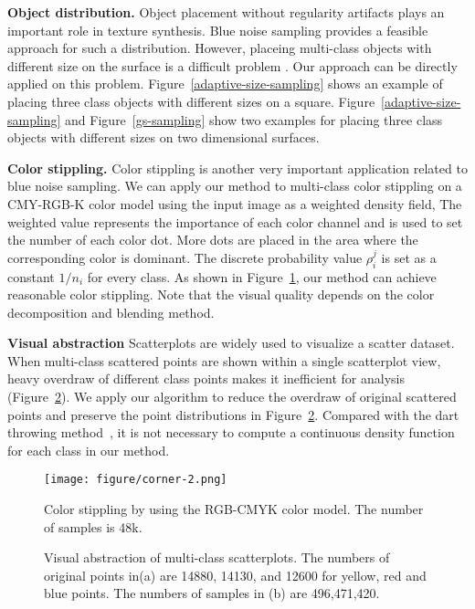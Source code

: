 \textbf{Object distribution.}
Object placement without regularity artifacts plays an important role in texture synthesis.
Blue noise sampling provides a feasible approach for such a distribution.
However,
placeing multi-class objects with different size on the surface is a difficult problem .
Our approach can be directly applied on this problem.
Figure~\ref{adaptive-size-sampling} shows an example of placing three class objects with different sizes on a square.
Figure~\ref{adaptive-size-sampling} and Figure~\ref{gs-sampling} show two examples for placing three class objects with different sizes on two dimensional surfaces.

\textbf{Color stippling.}
Color stippling is another very important application related to blue noise sampling.
We can apply our method to multi-class color stippling on a CMY-RGB-K color model using the input image as a weighted density field,
The weighted value represents the importance of each color channel and is used to set the number of each color dot.
More dots are placed in the
area where the corresponding color is dominant.
The discrete probability value $\rho_i^j$ is set as a constant $1/n_i$ for every class.
As shown in Figure~\ref{Color stippling},
our method can achieve reasonable color stippling.
Note that the visual quality depends on the color decomposition and blending method.

\textbf{Visual abstraction}
Scatterplots are widely used to visualize a scatter dataset.
When multi-class scattered points are shown within a single scatterplot view, heavy overdraw of different class points makes it inefficient for analysis (Figure~\ref{visual-abstraction}).
We apply our algorithm to reduce the overdraw of original scattered points and preserve the point distributions in Figure~\ref{visual-abstraction}.
Compared with the dart throwing method~\cite{wei:2010:multi,chen:2014:visual},
it is not necessary to compute a continuous density function for each class in our method.



\begin{figure}[htb]
  \centering
    \texttt{[image: figure/corner-2.png]}
   \caption{Color stippling by using the RGB-CMYK color model.
  The number of samples is 48k.  }\label{Color stippling}
\end{figure}

\begin{figure}[htb]
  \centering

  \caption{Visual abstraction of multi-class scatterplots.
   The numbers of original points in(a) are 14880, 14130, and 12600 for yellow, red and blue points.
   The numbers of samples in (b) are 496,471,420.}
   \label{visual-abstraction}
\end{figure}
